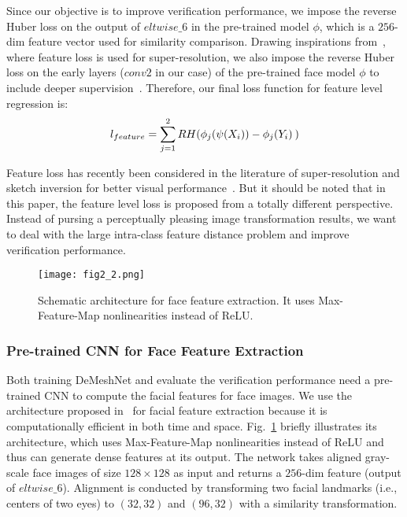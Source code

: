 \documentclass[10pt,twocolumn,letterpaper]{article}
\begin{document}
Since our objective is to improve verification performance, we impose the reverse Huber loss on the output of $eltwise\_6$ in the pre-trained model $\phi$, which is a $256$-dim feature vector used for similarity comparison. Drawing inspirations from~\cite{johnson2016perceptual}, where feature loss is used for super-resolution, we also impose the reverse Huber loss on the early layers ($conv2$ in our case) of the pre-trained face model $\phi$ to include deeper supervision~\cite{lee2014deeply}. Therefore, our final loss function for feature level regression is:
\begin{equation}{l_{feature}} = \sum\limits_{j=1}^2 {RH({\phi _j}(\psi ({X_i})) - {\phi _j}({Y_i})} {\kern 1pt} {\kern 1pt} )
\end{equation}


Feature loss has recently been considered in the literature of super-resolution and sketch inversion for better visual performance~\cite{guccluturk2016convolutional,johnson2016perceptual,LedigTHCATTWS16}. But it should be noted that in this paper, the feature level loss is proposed from a totally different perspective. Instead of pursing a perceptually pleasing image transformation results, we want to deal with the large intra-class feature distance problem and improve verification performance.


\begin{figure}
  \centering
    \texttt{[image: fig2\_2.png]}
    \caption{Schematic architecture for face feature extraction. It uses Max-Feature-Map nonlinearities instead of ReLU.}
    \label{fig:face} %
\end{figure}


\subsubsection{Pre-trained CNN for Face Feature Extraction} Both training DeMeshNet and evaluate the verification performance need a pre-trained CNN to compute the facial features for face images. We use the architecture proposed in~\cite{wu2015lightened} for facial feature extraction because it is computationally efficient in both time and space. Fig.~\ref{fig:face} briefly illustrates its architecture, which uses Max-Feature-Map nonlinearities instead of ReLU and thus can generate dense features at its output. The network takes aligned gray-scale face images of size $128 \times 128$ as input and returns a $256$-dim feature (output of $eltwise\_6$). Alignment is conducted by transforming two facial landmarks (i.e., centers of two eyes) to $(32,32)$ and $(96,32)$ with a similarity transformation.
\end{document}

